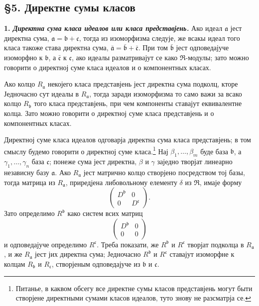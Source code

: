 \documentclass[11pt]{article}
\begin{document}
\setcounter{footnote}{26}

\subsection*{§5. Директне сумы класов}

\textbf{1. \emph{Директна сума класа идеалов или класа представјень.}} Ако идеал $\mathfrak a$ јест директна сума, $\mathfrak a=\mathfrak b+\mathfrak c$, тогда из изоморфизма следује, же всакы идеал того класа такоже става директна сума,
$\bar{\mathfrak a}=\bar{\mathfrak b}+\bar{\mathfrak c}$. При том $\bar{\mathfrak b}$ јест одповедајуче изоморфно к $\mathfrak b$, а $\bar{\mathfrak c}$ к $\mathfrak c$, ако идеалы разматривајут се како $\mathfrak R$-модулы; зато можно говорити о директној суме класа идеалов и о компонентных класах.

Ако колцо $R_{\mathfrak a}$ некојего класа представјень јест директна сума подколц, кторе Једночасно сут идеалы в $R_{\mathfrak a}$, тогда заради изоморфизма то само важи за всако колцо $R_{\mathfrak b}$ того класа представјень, при чем компоненты ставајут еквивалентне колца. Зато можно говорити о директној суме класа представјень и о компонентных класах.

Директној суме класа идеалов одговарја директна сума класа представјень; в том смыслу будемо говорити о директној суме класа.\footnote{Питанье, в каквом обсегу все директне сумы класов представјень могут быти створјене директными сумами класов идеалов, туто знову не разсматрја се.} Нај $\beta_1,\ldots,\beta_m$ буде база $\mathfrak b$, а $\gamma_1,\ldots,\gamma_n$ база $\mathfrak c$; понеже сума јест директна, $\beta$ и $\gamma$ заједно творјат линеарно независну базу $\mathfrak a$. Ако $R_{\mathfrak a}$ јест матрично колцо створјено посредством тој базы, тогда матрица из $R_{\mathfrak a}$, приредјена либовольному елементу $\delta$ из $\mathfrak R$, имаје форму
\[
        \begin{pmatrix}D^{\mathfrak b}&0\\0&D^{\mathfrak c}\end{pmatrix}.
\]
Зато определимо $R^{\mathfrak b}$ како систем всих матриц
\[
        \begin{pmatrix}D^{\mathfrak b}&0\\0&0\end{pmatrix}
\]
и одповедајуче определимо $R^{\mathfrak c}$. Треба показати, же $R^{\mathfrak b}$ и $R^{\mathfrak c}$ творјат подколца в $R_{\mathfrak a}$, и же $R_{\mathfrak a}$ јест јих директна сума; Једночасно $R^{\mathfrak b}$ и $R^{\mathfrak c}$ ставајут изоморфне к колцам $R_{\mathfrak b}$ и $R_{\mathfrak c}$, створјеным одповедајуче из $\mathfrak b$ и $\mathfrak c$.
\end{document}
